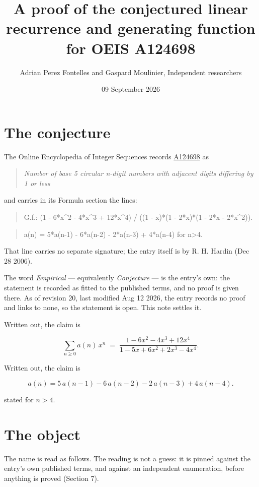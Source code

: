 \documentclass[11pt]{article}
\title{A proof of the conjectured linear recurrence and generating function for OEIS A124698}
\author{Adrian Perez Fontelles and Gaspard Moulinier, Independent researchers}
\date{09 September 2026}
\theoremstyle{definition}
\begin{document}
\maketitle
\section{The conjecture}

The Online Encyclopedia of Integer Sequences records \href{https://oeis.org/A124698}{A124698} as

\begin{quote}\itshape Number of base 5 circular n-digit numbers with adjacent digits differing by 1 or less\end{quote}

and carries in its Formula section the lines:

\begin{quote}\ttfamily G.f.: (1 - 6*x\textasciicircum{}2 - 4*x\textasciicircum{}3 + 12*x\textasciicircum{}4) / ((1 - x)*(1 - 2*x)*(1 - 2*x - 2*x\textasciicircum{}2)).\end{quote}

\begin{quote}\ttfamily a(n) = 5*a(n-1) - 6*a(n-2) - 2*a(n-3) + 4*a(n-4) for n>4.\end{quote}

That line carries no separate signature; the entry itself is by R. H. Hardin (Dec 28 2006).

The word {\itshape Empirical} --- equivalently {\itshape Conjecture} --- is the entry's own: the statement is recorded as fitted to the published terms, and no proof is given there. As of revision 20, last modified Aug 12 2026, the entry records no proof and links to none, so the statement is open. This note settles it.

Written out, the claim is

\[\sum_{n \ge 0} a(n)\,x^n \;=\; \frac{1 - 6x^{2} - 4x^{3} + 12x^{4}}{1 - 5x + 6x^{2} + 2x^{3} - 4x^{4}}.\]

Written out, the claim is

\[a(n) = 5\,a(n-1) - 6\,a(n-2) - 2\,a(n-3) + 4\,a(n-4).\]

stated for $n > 4$.

\section{The object}

The name is read as follows. The reading is not a guess: it is pinned against the entry's own published terms, and against an independent enumeration, before anything is proved (Section 7).
\end{document}
